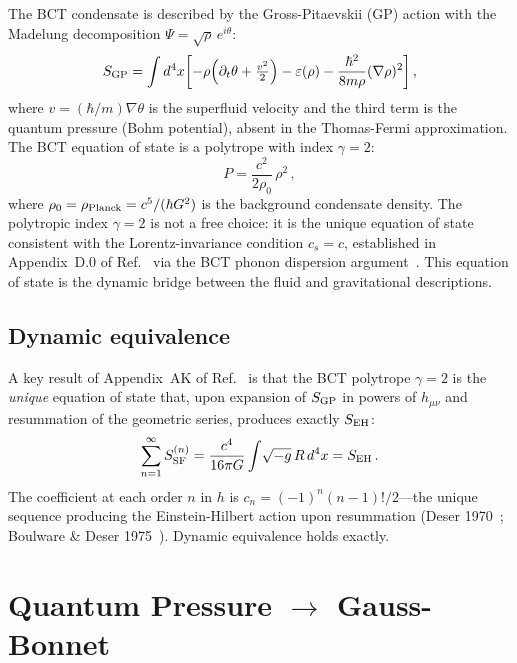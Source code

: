 \documentclass[twocolumn,10pt,a4paper]{article}
\begin{document}
The BCT condensate is described by the Gross-Pitaevskii (GP) action with
the Madelung decomposition $\Psi = \sqrt{\rho}\,e^{i\theta}$:
\begin{equation}
  S_{\rm GP} = \int d^4x\!\left[
    -\rho\!\left(\partial_t\theta + \tfrac{v^2}{2}\right)
    - \varepsilon(\rho)
    - \frac{\hbar^2}{8m\rho}(\nabla\rho)^2
  \right],
  \label{eq:SGP}
\end{equation}
where $v = (\hbar/m)\nabla\theta$ is the superfluid velocity and the
third term is the quantum pressure (Bohm potential), absent in the
Thomas-Fermi approximation. The BCT equation of state is a polytrope
with index $\gamma = 2$:
\begin{equation}
  P = \frac{c^2}{2\rho_0}\,\rho^2\,,
  \label{eq:EOS}
\end{equation}
where $\rho_0 = \rho_{\rm Planck} = c^5/(\hbar G^2)$ is the background
condensate density. The polytropic index $\gamma = 2$ is not a free
choice: it is the unique equation of state consistent with the
Lorentz-invariance condition $c_s = c$, established in
Appendix~D.0 of Ref.~\cite{monograph} via the BCT phonon dispersion
argument~\cite{lorentz}. This equation of state is the dynamic bridge
between the fluid and gravitational descriptions.

\subsection*{Dynamic equivalence}
A key result of Appendix~AK of Ref.~\cite{monograph} is that the BCT
polytrope $\gamma = 2$ is the \textit{unique} equation of state that,
upon expansion of $S_{\rm GP}$ in powers of $h_{\mu\nu}$ and
resummation of the geometric series, produces exactly $S_{\rm EH}$:
\begin{equation}
  \sum_{n=1}^{\infty} S_{\rm SF}^{(n)} =
  \frac{c^4}{16\pi G}\int\!\sqrt{-g}\,R\,d^4x = S_{\rm EH}\,.
  \label{eq:resumm}
\end{equation}
The coefficient at each order $n$ in $h$ is
$c_n = (-1)^n(n-1)!/2$---the unique sequence producing the
Einstein-Hilbert action upon resummation (Deser 1970~\cite{deser70};
Boulware \& Deser 1975~\cite{bd75}). Dynamic equivalence holds exactly.

\section*{Quantum Pressure $\to$ Gauss-Bonnet}
\end{document}
